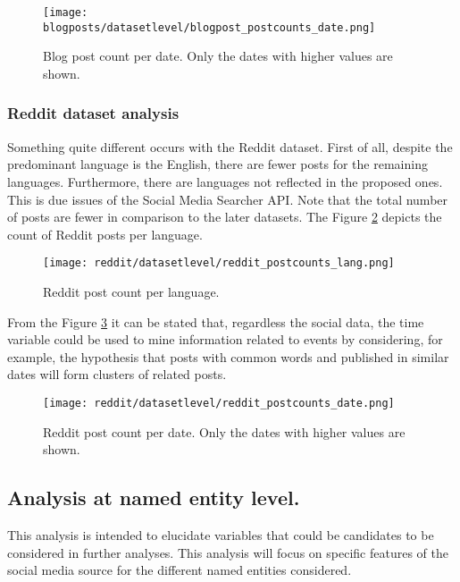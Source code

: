 \begin{figure}[H]
	\begin{center}
		\texttt{[image: blogposts/datasetlevel/blogpost\_postcounts\_date.png]}
		\caption{Blog post count per date. Only the dates with higher values are shown.}
		\label{fig:blogpost_postcounts_date}
	\end{center}
\end{figure}


\subsubsection{Reddit dataset analysis}
Something quite different occurs with the Reddit dataset. First of all, despite the predominant language is the English, there are fewer posts for the remaining languages. Furthermore, there are languages not reflected in the proposed ones. This is due issues of the Social Media Searcher API. Note that the total number of posts are fewer in comparison to the later datasets. The Figure \ref{fig:reddit_postcounts_lang} depicts the count of Reddit posts per language.

\begin{figure}[H]
	\begin{center}
		\texttt{[image: reddit/datasetlevel/reddit\_postcounts\_lang.png]}
		\caption{Reddit post count per language.}
		\label{fig:reddit_postcounts_lang}
	\end{center}
\end{figure}

From the Figure \ref{fig:reddit_postcounts_date} it can be stated that, regardless the social data, the time variable could be used to mine information related to events by considering, for example, the hypothesis that posts with common words and published in similar dates will form clusters of related posts.
\begin{figure}[H]
	\begin{center}
		\texttt{[image: reddit/datasetlevel/reddit\_postcounts\_date.png]}
		\caption{Reddit post count per date. Only the dates with higher values are shown.}
		\label{fig:reddit_postcounts_date}
	\end{center}
\end{figure}

% 

\subsection{Analysis at named entity level.}
This analysis is intended to elucidate variables that could be candidates to be considered in further analyses. This analysis will focus on specific features of the social media source for the different named entities considered.
